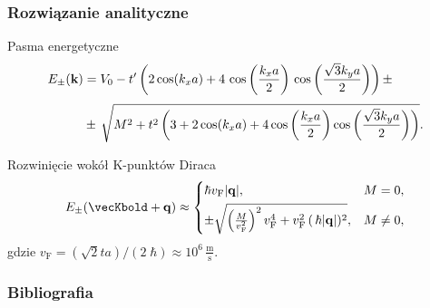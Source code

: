 \documentclass[10pt,t]{beamer}
\begin{document}
\begin{frame}
  \frametitle{Rozwiązanie analityczne}


  Pasma energetyczne
  \begin{equation}
    \begin{split}
      E_{ \pm }( \mathbf{k} )
      &=
        V_{ 0 } - t' \left( 2 \cos( k_{ x } a )
        + 4 \, \cos\left( \frac{ k_{ x } a }{ 2 } \right) \,
        \cos\left( \frac{ \sqrt{ 3 } k_{ y } a }{ 2 } \right)
        \right) \pm \\[0.3em]
      &\pm \, \sqrt{ M^{ 2 } + t^{ 2 } \left( 3 + 2 \cos( k_{ x } a )
        + 4 \cos\left( \frac{ k_{ x } a }{ 2 } \right)
        \cos\left( \frac{ \sqrt{ 3 } k_{ y } a }{ 2 } \right) \right) }.
    \end{split}
  \end{equation}

  Rozwinięcie wokół K-punktów Diraca
  \begin{equation}
    E_{ \pm }( \vecKbold + \vecqbold ) \approx
    \begin{cases}
      \hbar v_{ \textrm{F} } | \vecqbold |, & M = 0, \\[0.3em]
      \pm\sqrt{ \left( \frac{ M }{ v_{ \textrm{F} }^{ 2 } } \right)^{ 2 }
      v_{ \textrm{F} }^{ 4 }
      + v_{ \textrm{F} }^{ 2 } \, ( \, \hbar | \vecqbold | )^{ 2 } }, & M \neq 0,
    \end{cases}
  \end{equation}
  gdzie $v_{ \textrm{F} } = ( \sqrt{ 2 } t a ) / ( 2 \; \hbar ) \approx 10^{ 6 } \,
  \frac{ \textrm{m} }{ \textrm{s} }$.

\end{frame}




















\begin{frame}
  \frametitle{Bibliografia}


  

  {}

\end{frame}






\end{document}
